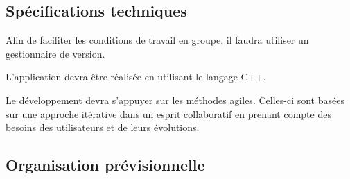 \documentclass{report}
\begin{document}
\subsection{Spécifications techniques}

\hspace{0.5cm}Afin de faciliter les conditions de travail en groupe, il faudra utiliser un gestionnaire de version.\par
L'application devra être réalisée en utilisant le langage C++.\par
Le développement devra s'appuyer sur les méthodes agiles. Celles-ci sont basées sur une approche itérative dans un esprit collaboratif en prenant compte des besoins des utilisateurs et de leurs évolutions.\par

\subsection{Organisation prévisionnelle}
\end{document}

